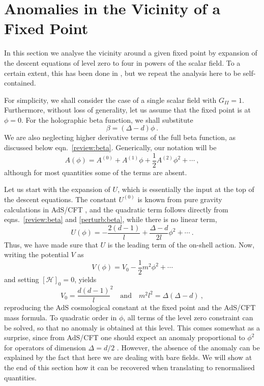 \documentclass[a4paper,12pt]{article}
\begin{document}
\section{Anomalies in the Vicinity of a Fixed Point}
\label{perturb}
In this section we analyse the vicinity around a given fixed point by
expansion of the descent equations of level zero to four in powers of
the scalar field. To a certain extent, this has been done in
\cite{Fukuma00a}, but we repeat the analysis here to be
self-contained.

For simplicity, we shall consider the case of a single scalar field
with $G_{II}=1$. Furthermore, without loss of generality, let us
assume that the fixed point is at 
$\phi=0$. For the holographic beta function, we shall substitute 
\begin{equation}
\label{perturb:beta}
  \beta = (\Delta-d) \phi~.
\end{equation}
We are also neglecting higher derivative terms of the full beta function, 
as discussed below eqn.\ \eqref{review:beta}.  
Generically, our notation will be 
\begin{equation}
\label{perturb:form}
  A(\phi) = A^{(0)} + A^{(1)} \phi +\frac12 A^{(2)} \phi^2 +\cdots~, 
\end{equation}
although for most quantities some of the terms are absent.

Let us start with the expansion of $U$, which is essentially the input
at the top of the descent equations. The constant $U^{(0)}$ is known
from pure gravity calculations in AdS/CFT
\cite{Liu98-1,Arutyunov98-1}, and the quadratic term follows directly
from eqns.\ \eqref{review:beta} and \eqref{perturb:beta}, while there
is no linear term, 
\begin{equation}
\label{perturb:U}
  U(\phi) = -\frac{2(d-1)}l + \frac{\Delta-d}{2l} \phi^2 +\cdots~.
\end{equation}
Thus, we have made sure that $U$ is the leading term of the on-shell
action. Now, writing the potential $V$ as 
\begin{equation}
  V(\phi) = V_0 - \frac12 m^2 \phi^2 +\cdots
\end{equation}
and setting $[\mathcal{H}]_0=0$, yields 
\begin{equation}
  V_0 = \frac{d(d-1)}l^2 \quad \text{and} \quad
  m^2 l^2 = \Delta(\Delta-d)~,\label{formula34}
\end{equation}
reproducing the AdS cosmological constant at the fixed
point and the AdS/CFT mass formula. To quadratic order in $\phi$, all
terms of the level zero constraint can be solved, so that no anomaly
is obtained at this level. This comes somewhat as a surprise, since
from AdS/CFT one should expect an anomaly proportional to $\phi^2$
for operators of dimension $\Delta=d/2$ \cite{deHaro00a}. 
However, the absence of the anomaly can be explained by the fact that
here we are dealing with bare fields.  We will show at the end of this
section how it can be recovered when translating to renormalised
quantities.
\end{document}
